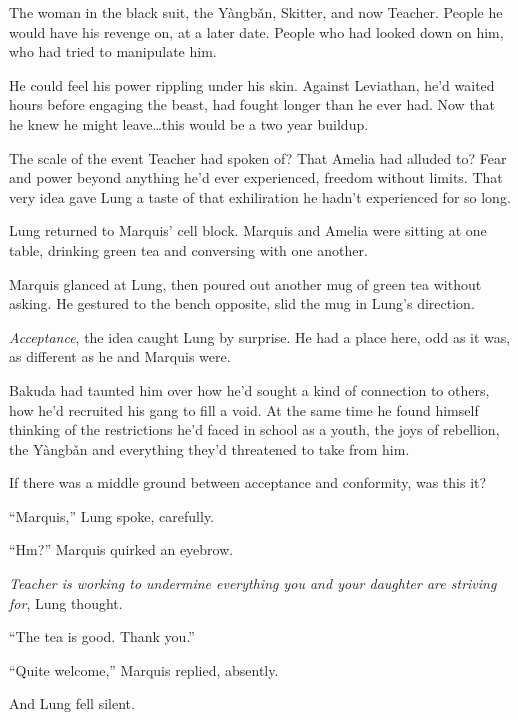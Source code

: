 The woman in the black suit, the Y\`{a}ngb\v{a}n, Skitter, and now Teacher.  People he would have his revenge on, at a later date.  People who had looked down on him, who had tried to manipulate him.



He could feel his power rippling under his skin.  Against Leviathan, he'd waited hours before engaging the beast, had fought longer than he ever had.  Now that he knew he might leave\ldots this would be a two year buildup.



The scale of the event Teacher had spoken of?  That Amelia had alluded to?  Fear and power beyond anything he'd ever experienced, freedom without limits.  That very idea gave Lung a taste of that exhiliration he hadn't experienced for so long.



Lung returned to Marquis' cell block.  Marquis and Amelia were sitting at one table, drinking green tea and conversing with one another.



Marquis glanced at Lung, then poured out another mug of green tea without asking.  He gestured to the bench opposite, slid the mug in Lung's direction.



\emph{Acceptance}, the idea caught Lung by surprise.  He had a place here, odd as it was, as different as he and Marquis were.



Bakuda had taunted him over how he'd sought a kind of connection to others, how he'd recruited his gang to fill a void.  At the same time he found himself thinking of the restrictions he'd faced in school as a youth, the joys of rebellion, the Y\`{a}ngb\v{a}n and everything they'd threatened to take from him.



If there was a middle ground between acceptance and conformity, was this it?



``Marquis,'' Lung spoke, carefully.



``Hm?'' Marquis quirked an eyebrow.



\emph{Teacher is working to undermine everything you and your daughter are striving for}, Lung thought.



``The tea is good.  Thank you.''



``Quite welcome,'' Marquis replied, absently.



And Lung fell silent.






